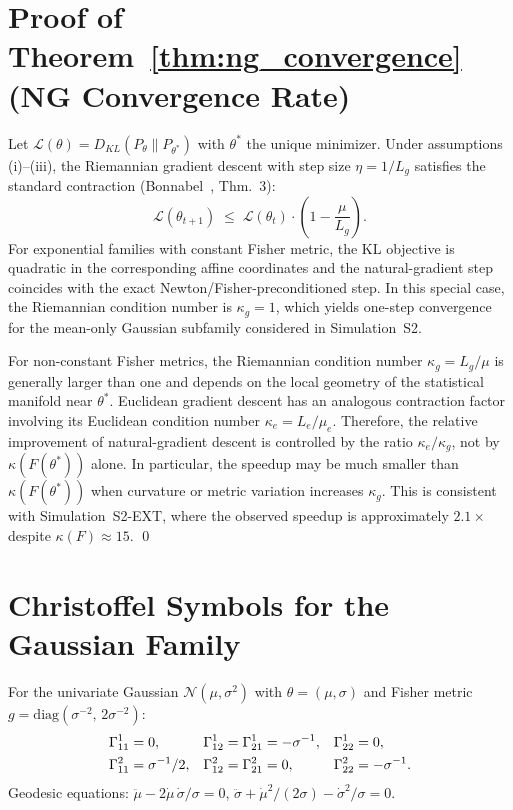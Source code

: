 \documentclass[a4paper,fleqn]{cas-dc}
\begin{document}
\section{Proof of Theorem~\ref{thm:ng_convergence} (NG Convergence Rate)}
\label{app:ng_convergence}

Let $\mathcal{L}(\theta) = D_{KL}(P_\theta \| P_{\theta^*})$ with
$\theta^*$ the unique minimizer.  Under assumptions (i)--(iii), the
Riemannian gradient descent with step size $\eta = 1/L_g$ satisfies
the standard contraction (Bonnabel~\cite{bonnabel2013stochastic}, Thm.~3):
\[
  \mathcal{L}(\theta_{t+1}) \;\leq\; \mathcal{L}(\theta_t)
  \cdot \left(1 - \frac{\mu}{L_g}\right).
\]
For exponential families with constant Fisher metric, the KL objective is
quadratic in the corresponding affine coordinates and the natural-gradient
step coincides with the exact Newton/Fisher-preconditioned step.  In this
special case, the Riemannian condition number is $\kappa_g=1$, which yields
one-step convergence for the mean-only Gaussian subfamily considered in
Simulation~S2.

For non-constant Fisher metrics, the Riemannian condition number
$\kappa_g=L_g/\mu$ is generally larger than one and depends on the local
geometry of the statistical manifold near $\theta^*$.  Euclidean gradient
descent has an analogous contraction factor involving its Euclidean
condition number $\kappa_e=L_e/\mu_e$.  Therefore, the relative improvement
of natural-gradient descent is controlled by the ratio $\kappa_e/\kappa_g$,
not by $\kappa(F(\theta^*))$ alone.  In particular, the speedup may be much
smaller than $\kappa(F(\theta^*))$ when curvature or metric variation
increases $\kappa_g$.  This is consistent with Simulation~S2-EXT, where the
observed speedup is approximately $2.1\times$ despite $\kappa(F)\approx 15$.
\qed

\section{Christoffel Symbols for the Gaussian Family}
\label{app:christoffel_gaussian}

For the univariate Gaussian $\mathcal{N}(\mu,\sigma^2)$ with
$\theta=(\mu,\sigma)$ and Fisher metric
$g = \mathrm{diag}(\sigma^{-2},\,2\sigma^{-2})$:
\begin{align}
  \Gamma_{11}^1 &= 0, & \Gamma_{12}^1 = \Gamma_{21}^1 &= -\sigma^{-1},
  & \Gamma_{22}^1 &= 0, \notag\\
  \Gamma_{11}^2 &= \sigma^{-1}/2, & \Gamma_{12}^2 = \Gamma_{21}^2 &= 0,
  & \Gamma_{22}^2 &= -\sigma^{-1}.
\end{align}
Geodesic equations: $\ddot\mu - 2\dot\mu\,\dot\sigma/\sigma = 0$,
$\ddot\sigma + \dot\mu^2/(2\sigma) - \dot\sigma^2/\sigma = 0$.
\end{document}
